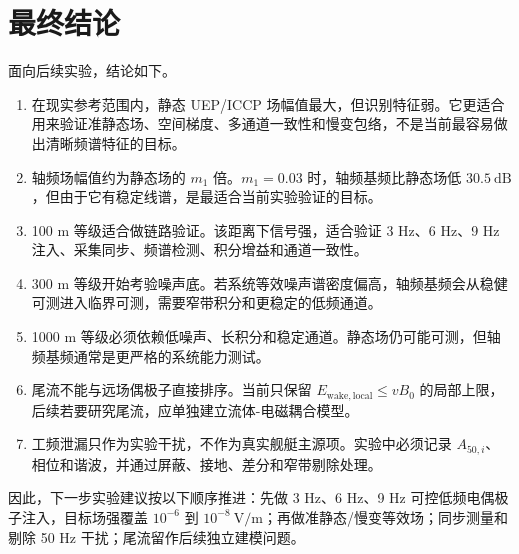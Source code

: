 \section{最终结论}

面向后续实验，结论如下。

\begin{enumerate}
    \item 在现实参考范围内，静态 UEP/ICCP 场幅值最大，但识别特征弱。它更适合用来验证准静态场、空间梯度、多通道一致性和慢变包络，不是当前最容易做出清晰频谱特征的目标。
    \item 轴频场幅值约为静态场的 $m_1$ 倍。$m_1=0.03$ 时，轴频基频比静态场低 $30.5\ \mathrm{dB}$，但由于它有稳定线谱，是最适合当前实验验证的目标。
    \item 100 m 等级适合做链路验证。该距离下信号强，适合验证 3 Hz、6 Hz、9 Hz 注入、采集同步、频谱检测、积分增益和通道一致性。
    \item 300 m 等级开始考验噪声底。若系统等效噪声谱密度偏高，轴频基频会从稳健可测进入临界可测，需要窄带积分和更稳定的低频通道。
    \item 1000 m 等级必须依赖低噪声、长积分和稳定通道。静态场仍可能可测，但轴频基频通常是更严格的系统能力测试。
    \item 尾流不能与远场偶极子直接排序。当前只保留 $E_{\mathrm{wake,local}}\le vB_0$ 的局部上限，后续若要研究尾流，应单独建立流体-电磁耦合模型。
    \item 工频泄漏只作为实验干扰，不作为真实舰艇主源项。实验中必须记录 $A_{50,i}$、相位和谐波，并通过屏蔽、接地、差分和窄带剔除处理。
\end{enumerate}

因此，下一步实验建议按以下顺序推进：先做 3 Hz、6 Hz、9 Hz 可控低频电偶极子注入，目标场强覆盖 $10^{-6}$ 到 $10^{-8}\ \mathrm{V/m}$；再做准静态/慢变等效场；同步测量和剔除 50 Hz 干扰；尾流留作后续独立建模问题。
